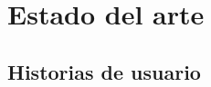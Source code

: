 \setcounter{chapter}{7}
\setcounter{section}{0}
\setcounter{subsection}{0}
\chapter{Estado del arte}
\section{Historias de usuario}